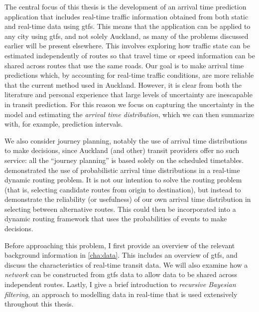 The central focus of this thesis is the development of an arrival time prediction application that includes real-time traffic information obtained from both static and real-time data using \gls{gtfs}. This means that the application can be applied to any city using \gls{gtfs}, and not solely Auckland, as many of the problems discussed earlier will be present elsewhere. This involves exploring how traffic state can be estimated independently of routes so that travel time or speed information can be shared across routes that use the same roads. Our goal is to make arrival time predictions which, by accounting for real-time traffic conditions, are more reliable that the current method used in Auckland. However, it is clear from both the literature and personal experience that large levels of uncertainty are inescapable in transit prediction. For this reason we focus on capturing the uncertainty in the model and estimating the \emph{arrival time distribution}, which we can then summarize with, for example, prediction intervals.


We also consider journey planning, notably the use of arrival time distributions to make decisions, since Auckland (and other) transit providers offer no such service: all the ``journey planning'' is based solely on the scheduled timetables.  demonstrated the use of probabilistic arrival time distributions in a real-time dynamic routing problem. It is not our intention to solve the routing problem (that is, selecting candidate routes from origin to destination), but instead to demonstrate the reliability (or usefulness) of our own arrival time distribution in selecting between alternative routes. This could then be incorporated into a dynamic routing framework that uses the probabilities of events to make decisions.


Before approaching this problem, I first provide an overview of the relevant background information in \cref{cha:data}. This includes an overview of \gls{gtfs}, and discuss the characteristics of real-time transit data. We will also examine how a \emph{network} can be constructed from \gls{gtfs} data to allow data to be shared across independent routes. Lastly, I give a brief introduction to \emph{recursive Bayesian filtering}, an approach to modelling data in real-time that is used extensively throughout this thesis.


